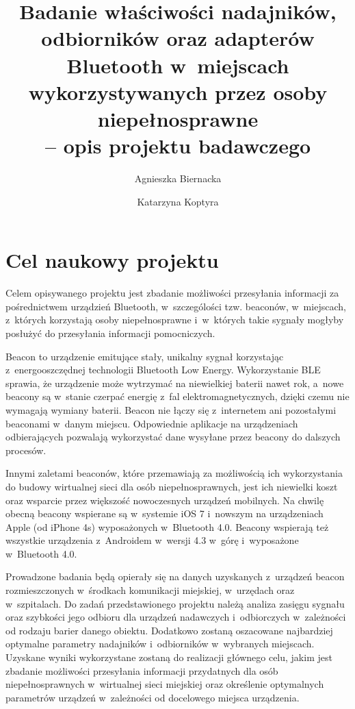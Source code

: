 \documentclass[a4paper]{article}
\begin{document}
\title{Badanie właściwości nadajników, odbiorników oraz adapterów Bluetooth w~miejscach wykorzystywanych przez osoby niepełnosprawne \\-- opis projektu badawczego}
\author{Agnieszka Biernacka \and Katarzyna Koptyra}
\maketitle

\section{Cel naukowy projektu}
Celem opisywanego projektu jest zbadanie możliwości przesyłania informacji za pośrednictwem urządzień Bluetooth, w~szczególości tzw. beaconów, w~miejscach, z~których korzystają osoby niepełnosprawne i~w~których takie sygnały mogłyby posłużyć do przesyłania informacji pomocniczych. 

Beacon to urządzenie emitujące stały, unikalny sygnał korzystając z~energooszczędnej technologii Bluetooth Low Energy. Wykorzystanie BLE sprawia, że urządzenie może wytrzymać na niewielkiej baterii nawet rok, a~nowe beacony są w~stanie czerpać energię z~fal elektromagnetycznych, dzięki czemu nie wymagają wymiany baterii.
Beacon nie łączy się z~internetem ani pozostałymi beaconami w~danym miejscu. Odpowiednie aplikacje na urządzeniach odbierających  pozwalają wykorzystać dane wysyłane przez beacony do dalszych procesów.

Innymi zaletami beaconów, które przemawiają za możliwością ich wykorzystania do budowy wirtualnej sieci dla osób niepełnosprawnych, jest ich niewielki koszt oraz wsparcie przez większość nowoczesnych urządzeń mobilnych. Na chwilę obecną beacony wspierane są w~systemie iOS 7 i~nowszym na urządzeniach Apple (od iPhone 4s) wyposażonych w~Bluetooth 4.0. Beacony wspierają też wszystkie urządzenia z~Androidem w~wersji 4.3 w~górę i~wyposażone w~Bluetooth 4.0.

Prowadzone badania będą opierały się na danych uzyskanych z~urządzeń beacon rozmieszczonych w~środkach komunikacji miejskiej, w~urzędach oraz w~szpitalach. Do zadań przedstawionego projektu należą analiza zasięgu sygnału oraz szybkości jego odbioru dla urządzeń nadawczych i~odbiorczych w~zależności od rodzaju barier danego obiektu. Dodatkowo zostaną oszacowane najbardziej optymalne parametry nadajników i~odbiorników w~wybranych miejscach. Uzyskane wyniki wykorzystane zostaną do realizacji głównego celu, jakim jest zbadanie możliwości przesyłania informacji przydatnych dla osób niepełnosprawnych w~wirtualnej sieci miejskiej oraz określenie optymalnych parametrów urządzeń w~zależności od docelowego miejsca urządzenia.
\end{document}
